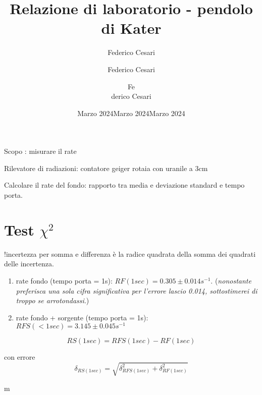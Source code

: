 \documentclass{article}
\title{Relazione di laboratorio - pendolo di Kater}
\author{Federico Cesari}
\date{Marzo 2024}\author{Fe\author{Federico Cesari}
\date{Marzo 2024}derico Cesari}
\date{Marzo 2024}
\begin{document}
	
	Scopo : misurare il rate 
	
	Rilevatore di radiazioni: contatore geiger
	rotaia con uranile a 3cm
	
	Calcolare il rate del fondo: rapporto tra media e deviazione standard e tempo porta.
	
	\section{Test $\chi^2$}
	!incertezza per somma e differenza è la radice quadrata della somma dei quadrati delle incertenza. \\
	
	\begin{enumerate}
		\item 	rate fondo (tempo porta = 1s): $RF(1sec) = 0.305 \pm 0.014 s^{-1}$. (\textit{nonostante preferisca una sola cifra significativa per l'errore lascio 0.014, sottostimerei di troppo se arrotondassi}.)
		\item rate fondo + sorgente (tempo porta = 1s): $RFS(<1sec) = 3.145 \pm 0.045 s^{-1}$
	\end{enumerate}
	\[
	RS(1sec) = RFS(1sec) - RF(1sec) 
	\]

	con errore
	\[
	\delta_{RS(1sec)} =\sqrt{\delta_{RFS(1sec)}^2 + \delta_{RF(1sec)}^2}
	\]
	
m

	
	
\end{document}
